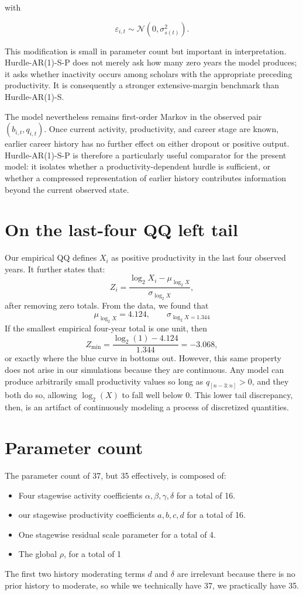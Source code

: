 \documentclass[twocolumn, letterpaper]{article}
\begin{document}
with

\[
    \varepsilon_{i,t}
    \sim
    \mathcal{N}
    \left(
        0,\sigma_{s(t)}^2
    \right).
\]

This modification is small in parameter count but important in interpretation. Hurdle-AR(1)-S-P does not merely ask how many zero years the model produces; it asks whether inactivity occurs among scholars with the appropriate preceding productivity. It is consequently a stronger extensive-margin benchmark than Hurdle-AR(1)-S.

The model nevertheless remains first-order Markov in the observed pair \((b_{i,t},q_{i,t})\). Once current activity, productivity, and career stage are known, earlier career history has no further effect on either dropout or positive output. Hurdle-AR(1)-S-P is therefore a particularly useful comparator for the present model: it isolates whether a productivity-dependent hurdle is sufficient, or whether a compressed representation of earlier history contributes information beyond the current observed state.

\section{On the last-four QQ left tail}
\label{supp:lastfour_qq_left_tail}

Our empirical QQ defines $X_i$ as positive productivity in the last four observed years. It further states that:
\[
Z_i = \frac{\log_2X_i-\mu_{\log_2X}}{\sigma_{\log_2X}},
\]
after removing zero totals. From the data, we found that
\[
\mu_{\log_2X} =4.124, \qquad \sigma_{\log_2X = 1.344}
\]
If the smallest empirical four-year total is one unit, then
\[
Z_{\min} = \frac{\log_2(1)-4.124}{1.344} = -3.068,
\]
or exactly where the blue curve in  bottoms out. However, this same property does not arise in our simulations because they are continuous. Any model can produce arbitrarily small productivity values so long as $q_{[n-3:n]} > 0$, and they both do so, allowing $\log_2(X)$ to fall well below 0. This lower tail discrepancy, then, is an artifact of continuously modeling a process of discretized quantities.

\section{Parameter count}
\label{supp:parameter_count}
The parameter count of 37, but 35 effectively, is composed of:
\begin{itemize}
    \item Four stagewise activity coefficients $\alpha, \beta,\gamma,\delta$ for a total of 16.
    \item our stagewise productivity coefficients $a,b,c,d$ for a total of 16.
    \item One stagewise residual scale parameter for a total of 4.
    \item The global $\rho$, for a total of 1
\end{itemize}
The first two history moderating terms $d$ and $\delta$ are irrelevant because there is no prior history to moderate, so while we technically have 37, we practically have 35.
\end{document}
